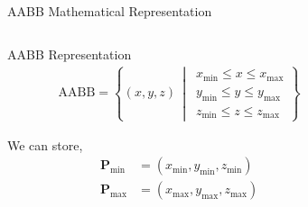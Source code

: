 \begin{frame}{AABB Mathematical Representation}
    \begin{columns}
        \begin{column}{0.6\textwidth}
            \begin{mathbox}{AABB Representation}
                \small
                \begin{align*}
                    \text{AABB} = \left\{ 
                    (x, y, z) \,\middle|\,
                    \begin{array}{c}
                    x_{\min} \leq x \leq x_{\max} \\
                    y_{\min} \leq y \leq y_{\max} \\
                    z_{\min} \leq z \leq z_{\max}
                    \end{array}
                    \right\}
                \end{align*}
                
                We can store,
                \begin{align*}
                    \mathbf{P}_{\text{min}} &= (x_{\text{min}}, y_{\text{min}}, z_{\text{min}}) \\
                    \mathbf{P}_{\text{max}} &= (x_{\text{max}}, y_{\text{max}}, z_{\text{max}}) \\
                \end{align*} 
            \end{mathbox}
        \end{column}
        \begin{column}{0.4\textwidth}
\end{column}
\end{columns}
\end{frame}
